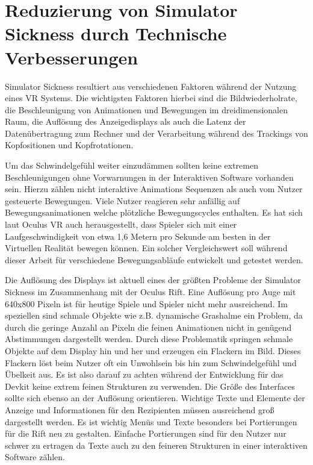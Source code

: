 \documentclass[pagesize, paper=a4, fontsize=12pt,titlepage=true, headings=small, headnosepline, abstractoff, liststotoc, nochapterprefix, plainheadsepline]{scrreprt}
\begin{document}
\section{Reduzierung von Simulator Sickness durch Technische Verbesserungen}
Simulator Sickness resultiert aus verschiedenen Faktoren während der Nutzung eines VR Systems. Die wichtigsten Faktoren hierbei sind die Bildwiederholrate, die Beschleunigung von Animationen und Bewegungen im dreidimensionalen Raum, die Auflösung des Anzeigedisplays als auch die Latenz der Datenübertragung zum Rechner und der Verarbeitung während des Trackings von Kopfositionen und Kopfrotationen. 

Um das Schwindelgefühl weiter einzudämmen sollten keine extremen Beschleunigungen ohne Vorwarnungen in der Interaktiven Software vorhanden sein. Hierzu zählen nicht interaktive Animations Sequenzen als auch vom Nutzer gesteuerte Bewegungen. Viele Nutzer reagieren sehr anfällig auf Bewegungsanimationen welche plötzliche Bewegungscycles enthalten. Es hat sich laut Oculus VR auch herausgestellt, dass Spieler sich mit einer Laufgeschwindigkeit von etwa 1,6 Metern pro Sekunde am besten in der Virtuellen Realität bewegen können. Ein solcher Vergleichswert soll während dieser Arbeit für verschiedene Bewegungsabläufe entwickelt und getestet werden.

Die Auflösung des Displays ist aktuell eines der größten Probleme der Simulator Sickness im Zusammenhang mit der Oculus Rift.  Eine Auflösung pro Auge mit 640x800 Pixeln ist für heutige Spiele und Spieler nicht mehr ausreichend. Im speziellen sind schmale Objekte wie z.B. dynamische Grashalme ein Problem, da durch die geringe Anzahl an Pixeln die feinen Animationen nicht in genügend Abstimmungen dargestellt werden. Durch diese Problematik springen schmale Objekte auf dem Display hin und her und erzeugen ein Flackern im Bild. Dieses Flackern löst beim Nutzer oft ein Unwohlsein bis hin zum Schwindelgefühl und Übelkeit aus. Es ist also darauf zu achten während der Entwicklung für das Devkit keine extrem feinen Strukturen zu verwenden. Die Größe des Interfaces sollte sich ebenso an der Auflösung orientieren. Wichtige Texte und Elemente der Anzeige und Informationen für den Rezipienten müssen ausreichend groß dargestellt werden. Es ist wichtig Menüs und Texte besonders bei Portierungen für die Rift neu zu gestalten. Einfache Portierungen sind für den Nutzer nur schwer zu ertragen da Texte auch zu den feineren Strukturen in einer interaktiven Software zählen.
\end{document}
